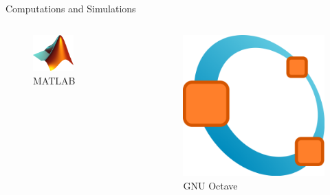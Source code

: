\documentclass[10pt]{beamer}
\begin{document}
    \begin{frame}{Computations and Simulations}
        \begin{columns}
            \begin{column}{0.5\textwidth}
                \begin{figure}
                    \includegraphics[width=0.5\textwidth]{images/matlab}
                    \caption{MATLAB}
                \end{figure}
            \end{column}
            \begin{column}{0.5\textwidth}
                \begin{figure}
                    \includegraphics[height=0.2\paperheight]{images/octave}
                    \caption{GNU Octave}

\end{figure}
\end{column}
\end{columns}
\end{frame}
\end{document}
